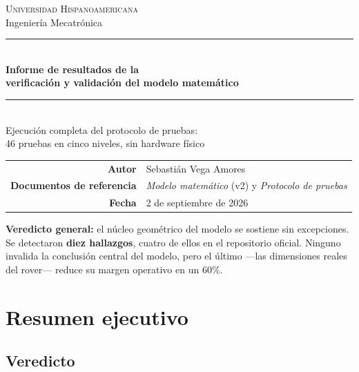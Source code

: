 \documentclass[11pt,a4paper]{article}
\begin{document}
\begin{titlepage}
\centering
\vspace*{2cm}
{\Large\scshape Universidad Hispanoamericana}\\[0.2cm]
{\large Ingeniería Mecatrónica}\\[2.2cm]

\rule{\linewidth}{1.2pt}\\[0.4cm]
{\LARGE\bfseries Informe de resultados de la\\[0.18cm]
verificación y validación del modelo matemático}\\[0.4cm]
\rule{\linewidth}{1.2pt}\\[0.8cm]

{\large Ejecución completa del protocolo de pruebas:\\
46 pruebas en cinco niveles, sin hardware físico}\\[2.2cm]

\begin{tabular}{rl}
\textbf{Autor} & Sebastián Vega Amores\\[0.12cm]
\textbf{Documentos de referencia} & \textit{Modelo matemático} (v2) y \textit{Protocolo de pruebas}\\[0.12cm]
\textbf{Fecha} & 2 de septiembre de 2026\\
\end{tabular}

\vfill
\begin{tcolorbox}[colback=black!4,colframe=black!55,boxrule=0.6pt,arc=1pt,width=0.88\linewidth]
\centering\small
\textbf{Veredicto general:} el núcleo geométrico del modelo se sostiene sin excepciones.
Se detectaron \textbf{diez hallazgos}, cuatro de ellos en el repositorio oficial.
Ninguno invalida la conclusión central del modelo, pero el último ---las dimensiones
reales del rover--- reduce su margen operativo en un $60\%$.
\end{tcolorbox}
\end{titlepage}

\tableofcontents
\newpage

\section{Resumen ejecutivo}

\subsection{Veredicto}
\end{document}
